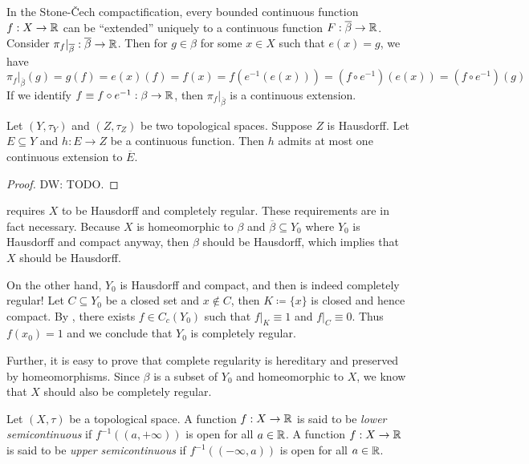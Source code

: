 \documentclass{techreport}
\newcommand{\diw}[1]{{\color{Red} DW: #1}}
\begin{document}
\begin{remark}
	In the Stone-{\v{C}}ech compactification, every bounded continuous function $f:X \to \mathbb{R}$ can be ``extended'' uniquely to a continuous function $F : \overline{\beta} \to \mathbb{R}$.
	Consider $\pi_f |_{\overline{\beta}} : \overline{\beta} \to \mathbb{R}$.
	Then for $g \in \beta$ for some $x \in X$ such that $e(x) = g$, we have
	\[
	\pi_f|_{\overline{\beta}}(g) = g(f) = e(x)(f) = f(x) = f(e^{-1}(e(x))) = (f \circ e^{-1})(e(x)) = (f \circ e^{-1})(g)
	\]
	If we identify $f \equiv f \circ e^{-1} : \beta \to \mathbb{R}$, then $\pi_f|_{\overline{\beta}}$ is a continuous extension.
\end{remark}

\begin{proposition}\label{Prop:ContIntoT2AtMostOneExt}
	Let $(Y,\tau_Y)$ and $(Z,\tau_Z)$ be two topological spaces.
	Suppose $Z$ is Hausdorff.
	Let $E \subseteq Y$ and $h : E \to Z$ be a continuous function.
	Then $h$ admits at most one continuous extension to $\overline{E}$.
\end{proposition}
\begin{proof}
	\diw{TODO.}
\end{proof}

\begin{remark}\label{Rem:StoneCechNecessary}
	 requires $X$ to be Hausdorff and completely regular.
	These requirements are in fact necessary.
	Because $X$ is homeomorphic to $\beta$ and $\overline{\beta} \subseteq Y_0$ where $Y_0$ is Hausdorff and compact anyway, then $\beta$ should be Hausdorff, which implies that $X$ should be Hausdorff.
	
	On the other hand, $Y_0$ is Hausdorff and compact, and then is indeed completely regular!
	Let $C \subseteq Y_0$ be a closed set and $x \not\in C$, then $K \coloneqq \{ x \}$ is closed and hence compact.
	By , there exists $f \in C_c(Y_0)$ such that $f|_K \equiv 1$ and $f|_{C} \equiv 0$.
	Thus $f(x_0) = 1$ and we conclude that $Y_0$ is completely regular.
	
	Further, it is easy to prove that complete regularity is hereditary and preserved by homeomorphisms.
	Since $\beta$ is a subset of $Y_0$ and homeomorphic to $X$, we know that $X$ should also be completely regular.
\end{remark}

\begin{definition}\label{De:SemiCont}
	Let $(X,\tau)$ be a topological space.
	A function $f : X \to \mathbb{R}$ is said to be \emph{lower semicontinuous} if $f^{-1}((a,+\infty))$ is open for all $a \in \mathbb{R}$.
	A function $f : X \to \mathbb{R}$ is said to be \emph{upper semicontinuous} if $f^{-1}((-\infty,a))$ is open for all $a \in \mathbb{R}$.
\end{definition}
\end{document}
